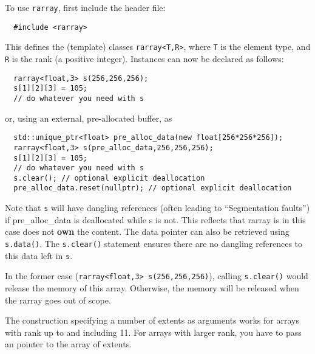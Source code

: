 \documentclass[11pt,twoside]{article}
\begin{document}
To use \texttt{rarray}, first include the header file:
\begin{framed}\vspace{-14pt}%
\begin{verbatim}
  #include <rarray>
\end{verbatim}%
\vspace{-14pt}
\end{framed}
\noindent
This defines the (template) classes \texttt{rarray{\tt<}T,R{\tt>}}, where
\texttt T is the element type, and \texttt R is the
rank (a positive integer).  Instances can now be
declared as follows:
\begin{framed}\vspace{-18pt}%
\begin{verbatim}
  rarray<float,3> s(256,256,256);
  s[1][2][3] = 105;
  // do whatever you need with s
\end{verbatim}%
\vspace{-14pt}
\end{framed}
\noindent
or, using an external, pre-allocated buffer, as
\begin{framed}\vspace{-18pt}%
\begin{verbatim}
  std::unique_ptr<float> pre_alloc_data(new float[256*256*256]); 
  rarray<float,3> s(pre_alloc_data,256,256,256);
  s[1][2][3] = 105;
  // do whatever you need with s
  s.clear(); // optional explicit deallocation
  pre_alloc_data.reset(nullptr); // optional explicit deallocation
\end{verbatim}%
\vspace{-14pt}
\end{framed}
Note that \texttt{s} will have dangling references (often leading to
``Segmentation faults'') if pre\_alloc\_data is deallocated while s is
not.  This reflects that rarray is in this case does not \textbf{own}
the content. The data pointer can also be retrieved using
\texttt{s.data()}. The \texttt{s.clear()} statement ensures there are
no dangling references to this data left in \texttt{s}. 

In the former case (\texttt{rarray<float,3> s(256,256,256)}), calling
\texttt{s.clear()}  would
release the memory of this array. Otherwise, the memory will be
released when the rarray goes out of scope.

The construction specifying a number of extents as arguments works for arrays with rank up to and including 11. For arrays with larger rank, you have to pass an pointer to the array of extents.
\end{document}
